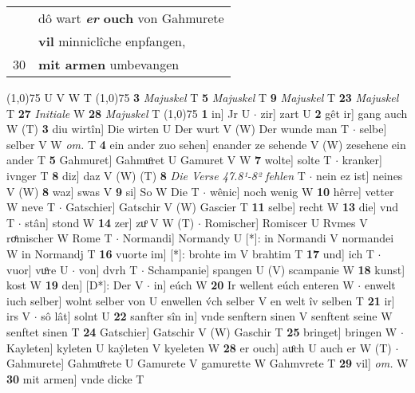 \documentclass[8pt,a4paper,notitlepage]{article}
\begin{document}
\begin{table}[ht]
\begin{minipage}[t]{0.5\linewidth}
\begin{tabular}{rl}
 & dô wart \textbf{\textit{er} ouch} von Gahmurete\\ 
 & \textbf{vil} minniclîche enpfangen,\\ 
30 & \textbf{mit armen} umbevangen\\ 
\end{tabular}
\scriptsize
\line(1,0){75} \newline
U V W T \newline
\line(1,0){75} \newline
\textbf{3} \textit{Majuskel} T  \textbf{5} \textit{Majuskel} T  \textbf{9} \textit{Majuskel} T  \textbf{23} \textit{Majuskel} T  \textbf{27} \textit{Initiale} W  \textbf{28} \textit{Majuskel} T  \newline
\line(1,0){75} \newline
\textbf{1} in] Jr U  $\cdot$ zir] zart U \textbf{2} gêt ir] gang auch W (T) \textbf{3} diu wirtîn] Die wirten U Der wurt V (W) Der wunde man T  $\cdot$ selbe] selber V W \textit{om.} T \textbf{4} ein ander zuo sehen] enander ze sehende V (W) zesehene ein ander T \textbf{5} Gahmuret] Gahmuͦret U Gamuret V W \textbf{7} wolte] solte T  $\cdot$ kranker] ivnger T \textbf{8} diz] daz V (W) (T) \textbf{8} \textit{Die Verse 47.8¹-8² fehlen} T   $\cdot$ nein ez ist] neines V (W) \textbf{8} waz] swas V \textbf{9} si] So W Die T  $\cdot$ wênic] noch wenig W \textbf{10} hêrre] vetter W neve T  $\cdot$ Gatschier] Gatschir V (W) Gascier T \textbf{11} selbe] recht W \textbf{13} die] vnd T  $\cdot$ stân] stond W \textbf{14} zer] zuͦ V W (T)  $\cdot$ Romischer] Romiscer U Rvmes V roͤmischer W Rome T  $\cdot$ Normandi] Normandy U [*]: in Normandi V normandei W in Normandj T \textbf{16} vuorte im] [*]: brohte im V brahtim T \textbf{17} und] ich T  $\cdot$ vuor] vuͦre U  $\cdot$ von] dvrh T  $\cdot$ Schampanie] spangen U (V) scampanie W \textbf{18} kunst] kost W \textbf{19} den] [D*]: Der V  $\cdot$ in] eúch W \textbf{20} Ir wellent eúch enteren W  $\cdot$ enwelt iuch selber] wolnt selber von U enwellen v́ch selber V en welt îv selben T \textbf{21} ir] irs V  $\cdot$ sô lât] solnt U \textbf{22} sanfter sîn in] vnde senftern sinen V senftent seine W senftet sinen T \textbf{24} Gatschier] Gatschir V (W) Gaschir T \textbf{25} bringet] bringen W  $\cdot$ Kayleten] kyleten U kaẏleten V kyeleten W \textbf{28} er ouch] auͦch U auch er W (T)  $\cdot$ Gahmurete] Gahmuͦrete U Gamurete V gamurette W Gahmvrete T \textbf{29} vil] \textit{om.} W \textbf{30} mit armen] vnde dicke T \newline
\end{minipage}
\end{table}
\end{document}
